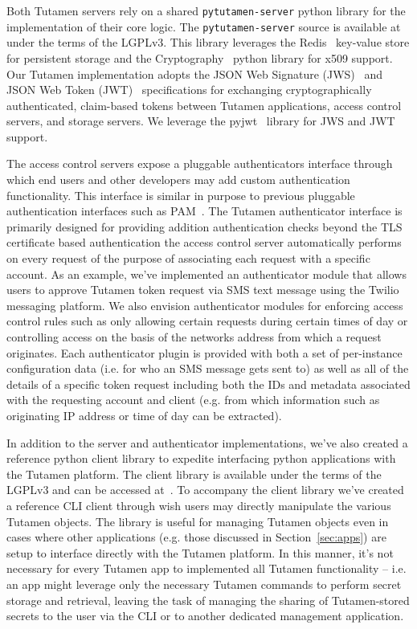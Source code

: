 Both Tutamen servers rely on a shared \texttt{pytutamen-server} python
library for the implementation of their core logic. The
\texttt{pytutamen-server} source is available
at~\cite{src-tutamen-pytutamenserver} under the terms of the
LGPLv3. This library leverages the Redis~\cite{redis} key-value store
for persistent storage and the Cryptography~\cite{python-cryptography}
python library for x509 support. Our Tutamen implementation adopts the
JSON Web Signature (JWS)~\cite{rfc7515} and JSON Web Token
(JWT)~\cite{rfc7519} specifications for exchanging cryptographically
authenticated, claim-based tokens between Tutamen applications, access
control servers, and storage servers. We leverage the
pyjwt~\cite{pyjwt} library for JWS and JWT support.

The access control servers expose a pluggable authenticators interface
through which end users and other developers may add custom
authentication functionality. This interface is similar in purpose to
previous pluggable authentication interfaces such as
PAM~\cite{samar1996}. The Tutamen authenticator interface is primarily
designed for providing addition authentication checks beyond the TLS
certificate based authentication the access control server
automatically performs on every request of the purpose of associating
each request with a specific account. As an example, we've implemented
an authenticator module that allows users to approve Tutamen token
request via SMS text message using the Twilio~\cite{twilio} messaging
platform. We also envision authenticator modules for enforcing access
control rules such as only allowing certain requests during certain
times of day or controlling access on the basis of the networks
address from which a request originates. Each authenticator plugin is
provided with both a set of per-instance configuration data (i.e. for
who an SMS message gets sent to) as well as all of the details of a
specific token request including both the IDs and metadata associated
with the requesting account and client (e.g. from which information
such as originating IP address or time of day can be extracted).

In addition to the server and authenticator implementations, we've
also created a reference python client library to expedite interfacing
python applications with the Tutamen platform. The client library is
available under the terms of the LGPLv3 and can be accessed
at~\cite{src-tutamen-pytutamen}. To accompany the client library we've
created a reference CLI client through wish users may directly
manipulate the various Tutamen objects. The library is useful for
managing Tutamen objects even in cases where other applications
(e.g. those discussed in Section~\ref{sec:apps}) are setup to
interface directly with the Tutamen platform. In this manner, it's not
necessary for every Tutamen app to implemented all Tutamen
functionality -- i.e. an app might leverage only the necessary Tutamen
commands to perform secret storage and retrieval, leaving the task of
managing the sharing of Tutamen-stored secrets to the user via the CLI
or to another dedicated management application.

